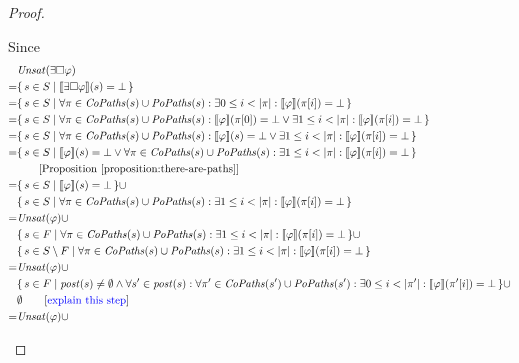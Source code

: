 \documentclass[12pt]{article}
\newcommand{\always}{\Box}
\theoremstyle{definition}
\newcommand{\comment}[1]{\hspace{2em}[\mbox{#1}]}
\newcommand{\satisfaction}[1]{\llbracket #1 \rrbracket}
\newcommand{\bottom}{\mathord{\perp}}
\newenvironment{franck}{\color{red}}{\color{black}}
\begin{document}
\begin{proof}
\begin{itemize}
\begin{franck}
Since
\begin{align*}
& \mathit{Unsat}(\exists \always \varphi)\\
= & \{\, s \in S \mid \satisfaction{\exists \always \varphi}(s) = \bottom \,\}\\
= & \{\, s \in S \mid \forall \pi \in \mathit{CoPaths}(s) \cup \mathit{PoPaths}(s) : \exists 0 \leq i < |\pi| : \satisfaction{\varphi}(\pi[i]) = \bottom \,\}\\
= & \{\, s \in S \mid \forall \pi \in \mathit{CoPaths}(s) \cup \mathit{PoPaths}(s) : \satisfaction{\varphi}(\pi[0]) = \bottom \vee \exists 1 \leq i < |\pi| : \satisfaction{\varphi}(\pi[i]) = \bottom \,\}\\
= & \{\, s \in S \mid \forall \pi \in \mathit{CoPaths}(s) \cup \mathit{PoPaths}(s) : \satisfaction{\varphi}(s) = \bottom \vee \exists 1 \leq i < |\pi| : \satisfaction{\varphi}(\pi[i]) = \bottom \,\}\\
= & \{\, s \in S \mid \satisfaction{\varphi}(s) = \bottom \vee \forall \pi \in \mathit{CoPaths}(s) \cup \mathit{PoPaths}(s) : \exists 1 \leq i < |\pi| : \satisfaction{\varphi}(\pi[i]) = \bottom \,\}\\
& \comment{Proposition~\ref{proposition:there-are-paths}}\\
= & \{\, s \in S \mid \satisfaction{\varphi}(s) = \bottom \,\} \cup\\
& \{\, s \in S \mid \forall \pi \in \mathit{CoPaths}(s) \cup \mathit{PoPaths}(s) : \exists 1 \leq i < |\pi| : \satisfaction{\varphi}(\pi[i]) = \bottom \,\}\\
= & \mathit{Unsat}(\varphi) \cup\\
& \{\, s \in F \mid \forall \pi \in \mathit{CoPaths}(s) \cup \mathit{PoPaths}(s) : \exists 1 \leq i < |\pi| : \satisfaction{\varphi}(\pi[i]) = \bottom \,\} \cup\\
& \{\, s \in S \setminus F \mid \forall \pi \in \mathit{CoPaths}(s) \cup \mathit{PoPaths}(s) : \exists 1 \leq i < |\pi| : \satisfaction{\varphi}(\pi[i]) = \bottom \,\}\\
= & \mathit{Unsat}(\varphi) \cup\\
& \{\, s \in F \mid \mathit{post}(s) \not= \emptyset \wedge \forall s' \in \mathit{post}(s) : \forall \pi' \in \mathit{CoPaths}(s') \cup \mathit{PoPaths}(s') : \exists 0 \leq i < |\pi'| : \satisfaction{\varphi}(\pi'[i]) = \bottom\,\} \cup\\
& \emptyset
\comment{\textcolor{blue}{explain this step}}\\
= & \mathit{Unsat}(\varphi) \cup\\

\end{align*}
\end{franck}
\end{itemize}
\end{proof}
\end{document}
